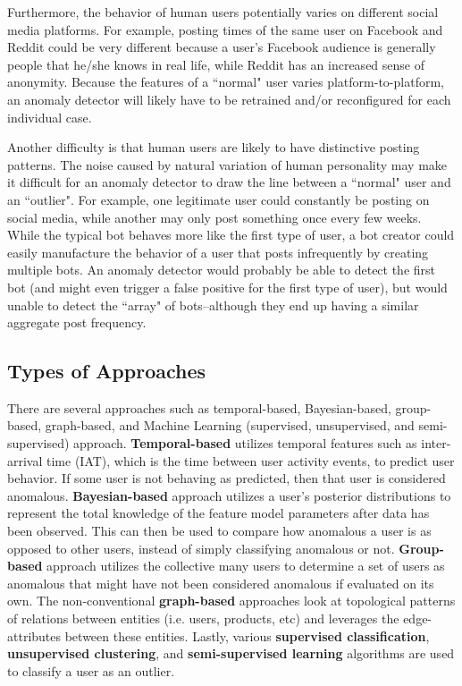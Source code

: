 \documentclass[11pt, oneside]{article}   	%
\begin{document}
\quad Furthermore, the behavior of human users potentially varies on different social media platforms.
For example, posting times of the same user on Facebook and Reddit could be very different because a user's Facebook audience is generally people that he/she knows in real life, while Reddit has an increased sense of anonymity.
Because the features of a ``normal" user varies platform-to-platform, an anomaly detector will likely have to be retrained and/or reconfigured for each individual case.

\quad Another difficulty is that human users are likely to have distinctive posting patterns.
The noise caused by natural variation of human personality may make it difficult for an anomaly detector to draw the line between a ``normal" user and an ``outlier".
For example, one legitimate user could constantly be posting on social media, while another may only post something once every few weeks.
While the typical bot behaves more like the first type of user, a bot creator could easily manufacture the behavior of a user that posts infrequently by creating multiple bots.
An anomaly detector would probably be able to detect the first bot (and might even trigger a false positive for the first type of user), but would unable to detect the ``array" of bots--although they end up having a similar aggregate post frequency.

\subsection{Types of Approaches}
There are several approaches such as temporal-based, Bayesian-based, group-based, graph-based, and Machine Learning (supervised, unsupervised, and semi-supervised) approach. \textbf{Temporal-based} utilizes temporal features such as inter-arrival time (IAT), which is the time between user activity events, to predict user behavior. If some user is not behaving as predicted, then that user is considered anomalous.  \textbf{Bayesian-based} approach utilizes a user's posterior distributions to represent the total knowledge of the feature model parameters after data has been observed. This can then be used to compare how anomalous a user is as opposed to other users, instead of simply classifying anomalous or not. \textbf{Group-based} approach utilizes the collective many users to determine a set of users as anomalous that might have not been considered anomalous if evaluated on its own. The non-conventional \textbf{graph-based} approaches look at topological patterns of relations between entities (i.e. users, products, etc) and leverages the edge-attributes between these entities. Lastly, various \textbf{supervised classification}, \textbf{unsupervised clustering}, and \textbf{semi-supervised learning} algorithms are used to classify a user as an outlier.
\end{document}

